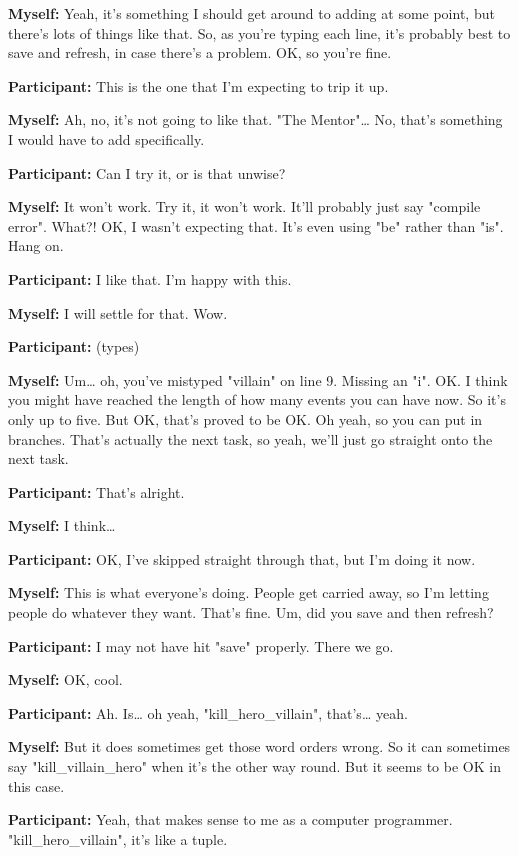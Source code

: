 \documentclass[11pt]{report}
\begin{document}
\begin{linenumbers}
\textbf{Myself:} Yeah, it's something I should get around to adding at some point, but there's lots of things like that. So, as you're typing each line, it's probably best to save and refresh, in case there's a problem. OK, so you're fine.

\textbf{Participant:} This is the one that I'm expecting to trip it up.

\textbf{Myself:} Ah, no, it's not going to like that. "The Mentor"\ldots{} No, that's something I would have to add specifically.

\textbf{Participant:} Can I try it, or is that unwise?

\textbf{Myself:} It won't work. Try it, it won't work. It'll probably just say "compile error". What?! OK, I wasn't expecting that. It's even using "be" rather than "is". Hang on.

\textbf{Participant:} I like that. I'm happy with this.

\textbf{Myself:} I will settle for that. Wow.

\textbf{Participant:} (types)

\textbf{Myself:} Um\ldots{} oh, you've mistyped "villain" on line 9. Missing an "i". OK. I think you might have reached the length of how many events you can have now. So it's only up to five. But OK, that's proved to be OK. Oh yeah, so you can put in branches. That's actually the next task, so yeah, we'll just go straight onto the next task.

\textbf{Participant:} That's alright.

\textbf{Myself:} I think\ldots{}

\textbf{Participant:} OK, I've skipped straight through that, but I'm doing it now.

\textbf{Myself:} This is what everyone's doing. People get carried away, so I'm letting people do whatever they want. That's fine. Um, did you save and then refresh?

\textbf{Participant:} I may not have hit "save" properly. There we go.

\textbf{Myself:} OK, cool.

\textbf{Participant:} Ah. Is\ldots{} oh yeah, "kill_hero_villain", that's\ldots{} yeah.

\textbf{Myself:} But it does sometimes get those word orders wrong. So it can sometimes say "kill_villain_hero" when it's the other way round. But it seems to be OK in this case.

\textbf{Participant:} Yeah, that makes sense to me as a computer programmer. "kill_hero_villain", it's like a tuple.


\end{linenumbers}
\end{document}
